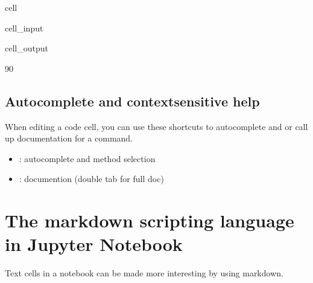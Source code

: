 \documentclass[letterpaper,10pt,english]{jupyterBook}
\begin{document}
\begin{sphinxuseclass}{cell}\begin{sphinxVerbatimInput}

\begin{sphinxuseclass}{cell_input}
\begin{sphinxVerbatim}[commandchars=\\\{\}]
\end{sphinxVerbatim}

\end{sphinxuseclass}\end{sphinxVerbatimInput}
\begin{sphinxVerbatimOutput}

\begin{sphinxuseclass}{cell_output}
\begin{sphinxVerbatim}[commandchars=\\\{\}]
90
\end{sphinxVerbatim}

\end{sphinxuseclass}\end{sphinxVerbatimOutput}

\end{sphinxuseclass}

\subsection{Auto\sphinxhyphen{}complete and context\sphinxhyphen{}sensitive help}
\label{\detokenize{content/04_PythonEssentials/Intro_Jupyter_notebook:auto-complete-and-context-sensitive-help}}
\sphinxAtStartPar
When editing a code cell, you can use these short\sphinxhyphen{}cuts to autocomplete and or call up documentation for a command.
\begin{itemize}
\item {} 
\sphinxAtStartPar
{}: autocomplete and  method selection

\item {} 
\sphinxAtStartPar
{}: documention (double tab for full doc)

\end{itemize}


\section{The markdown scripting language in Jupyter Notebook}
\label{\detokenize{content/04_PythonEssentials/Intro_Jupyter_notebook:the-markdown-scripting-language-in-jupyter-notebook}}
\sphinxAtStartPar
Text cells in a notebook can be made more interesting by using markdown.
\end{document}
